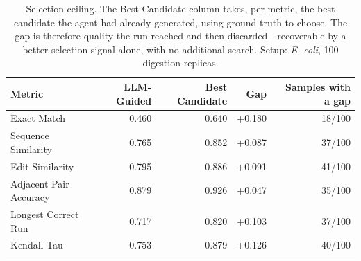 \begin{table}[!tb]
  \centering
  \caption{Selection ceiling. The Best Candidate column takes, per metric, the best candidate the agent had already generated, using ground truth to choose. The gap is therefore quality the run reached and then discarded - recoverable by a better selection signal alone, with no additional search. Setup: \textnormal{\textnormal{\textit{E. coli}}}, 100 digestion replicas.}
  \label{tab:selection_ceiling_ecoli_r100}
  \begin{tabular}{lrrrr}
    \toprule
    Metric & LLM-Guided & Best Candidate & Gap & Samples with a gap \\
    \midrule
    Exact Match & 0.460 & 0.640 & +0.180 & 18/100 \\
    Sequence Similarity & 0.765 & 0.852 & +0.087 & 37/100 \\
    Edit Similarity & 0.795 & 0.886 & +0.091 & 41/100 \\
    Adjacent Pair Accuracy & 0.879 & 0.926 & +0.047 & 35/100 \\
    Longest Correct Run & 0.717 & 0.820 & +0.103 & 37/100 \\
    Kendall Tau & 0.753 & 0.879 & +0.126 & 40/100 \\
    \bottomrule
  \end{tabular}
\end{table}
